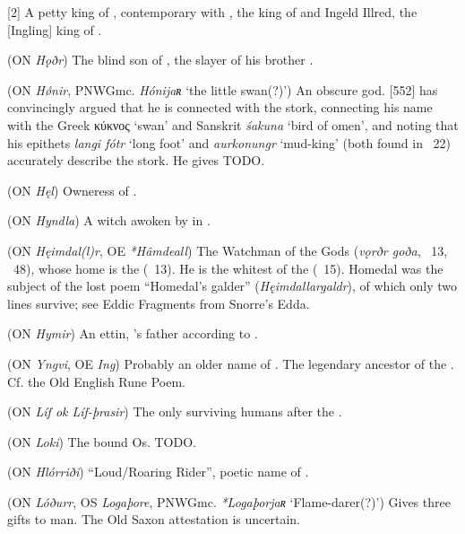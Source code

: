 \begin{itemize}
[2]
  A petty king of , contemporary with , the king of  and Ingeld Illred, the [Ingling] king of .

 (ON \emph{Hǫðr})
  The blind son of , the slayer of his brother .

 (ON \emph{Hǿnir}, PNWGmc. \emph{Hónijaʀ} ‘the little swan(?)’)
  An obscure god. \textcite{Rydberg1886}[552] has convincingly argued that he is connected with the stork, connecting his name with the Greek \textgreek{κύκνος} ‘swan’ and Sanskrit \emph{śakuna} ‘bird of omen’, and noting that his epithets \emph{langi fótr} ‘long foot’ and \emph{aurkonungr} ‘mud-king’ (both found in \Skaldskaparmal\ 22) accurately describe the stork. He gives  TODO.

 (ON \emph{Hęl})
  Owneress of .

 (ON \emph{Hyndla})
  A witch awoken by  in \Hyndluljod.

 (ON \emph{Hęimdal(l)r}, OE \emph{*Hâmdeall})
  The Watchman of the Gods (\emph{vǫrðr goða}, \Grimnismal\ 13, \Lokasenna\ 48), whose home is the  (\Grimnismal\ 13).  He is the whitest of the  (\Thrymskvida\ 15).  Homedal was the subject of the lost poem “Homedal’s galder” (\emph{Hęimdallargaldr}), of which only two lines survive; see Eddic Fragments from Snorre’s Edda.

 (ON \emph{Hymir})
  An ettin, ’s father according to \Hymiskvida.

 (ON \emph{Yngvi}, OE \emph{Ing})
  Probably an older name of . The legendary ancestor of the . Cf. the Old English Rune Poem.

 (ON \emph{Líf ok Líf-þrasir})
  The only surviving humans after the .

 (ON \emph{Loki})
  The bound Os. TODO.

 (ON \emph{Hlórriði})
  “Loud/Roaring Rider”, poetic name of .

 (ON \emph{Lóðurr}, OS \emph{Logaþore}, PNWGmc. \emph{*Logaþorjaʀ} ‘Flame-darer(?)’)
  Gives three gifts to man.  The Old Saxon attestation is uncertain.


\end{itemize}
